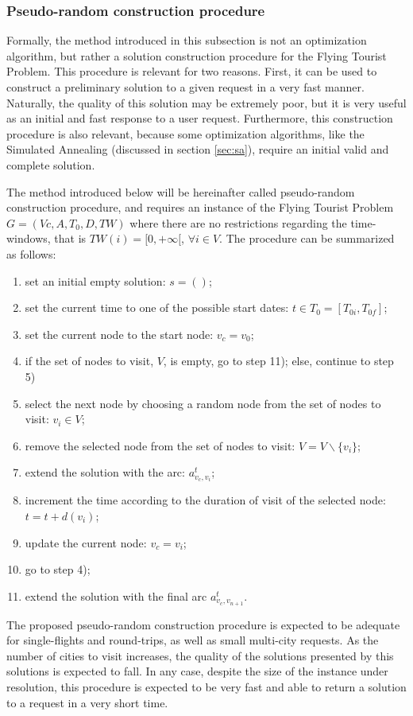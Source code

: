\subsubsection{Pseudo-random construction procedure}
\label{sec:pseudo_random}

Formally, the method introduced in this subsection is not an optimization algorithm, but rather a solution construction procedure for the Flying Tourist Problem. This procedure is relevant for two reasons. First, it can be used to construct a preliminary solution to a given request in a very fast manner. Naturally, the quality of this solution may be extremely poor, but it is very useful as an initial and fast response to a user request. Furthermore, this construction procedure is also relevant, because some optimization algorithms, like the Simulated Annealing (discussed in section \ref{sec:sa}), require an initial valid and complete solution.

The method introduced below will be hereinafter called pseudo-random construction procedure, and requires an instance of the Flying Tourist Problem $G=(Vc,A,T_0,D,TW)$ where there are no restrictions regarding the time-windows, that is $TW(i) = [0, +\infty[$, $\forall i \in V$. The procedure can be summarized as follows:

\begin{enumerate}
\itemsep0em 
    \item set an initial empty solution: $s=()$;
    \item set the current time to one of the possible start dates: $t \in T_0=[T_{0i}, T_{0f}]$;
    \item set the current node to the start node: $v_c = v_0$;
    \item if the set of nodes to visit, $V$, is empty, go to step 11); else, continue to step 5)
    \item select the next node by choosing a random node from the set of nodes to visit: $v_i \in V$;
    \item remove the selected node from the set of nodes to visit: $V=V\backslash\{v_i\}$;
    \item extend the solution with the arc: $a_{v_c, v_i}^t$;
    \item increment the time according to the duration of visit of the selected node: $t=t+d(v_i)$;
    \item update the current node: $v_c=v_i$;
    \item go to step 4);
    \item extend the solution with the final arc $a_{v_c, v_{n+1}}^t$.
\end{enumerate}

The proposed pseudo-random construction procedure is expected to be adequate for single-flights and round-trips, as well as small multi-city requests. As the number of cities to visit increases, the quality of the solutions presented by this solutions is expected to fall. In any case, despite the size of the instance under resolution, this procedure is expected to be very fast and able to return a solution to a request in a very short time.